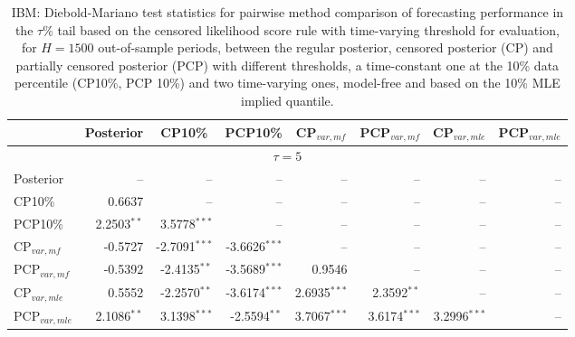 { \renewcommand{\arraystretch}{1.2} 
 {\footnotesize 
\begin{table} 
\center 
\begin{tabular}{l | rrrrrrr} 
& \multicolumn{1}{c}{Posterior}& \multicolumn{1}{c}{CP10\%}& \multicolumn{1}{c}{PCP10\%}& \multicolumn{1}{c}{CP$_{var,mf}$}& \multicolumn{1}{c}{PCP$_{var,mf}$}& \multicolumn{1}{c}{CP$_{var,mle}$}& \multicolumn{1}{c}{PCP$_{var,mle}$} \\ \hline 
\multicolumn{8}{c}{$\tau = 5$} \\ \hline 
Posterior &    --\phantom{$^{***}$} &    --\phantom{$^{***}$} &    --\phantom{$^{***}$} &    --\phantom{$^{***}$} &    --\phantom{$^{***}$} &    --\phantom{$^{***}$} &    --\phantom{$^{***}$}   \\ 
CP10\% & 0.6637\phantom{$^{***}$} &    --\phantom{$^{***}$} &    --\phantom{$^{***}$} &    --\phantom{$^{***}$} &    --\phantom{$^{***}$} &    --\phantom{$^{***}$} &    --\phantom{$^{***}$}   \\ 
PCP10\% & 2.2503$^{**}$\phantom{$^{*}$} & 3.5778$^{***}$ &    --\phantom{$^{***}$} &    --\phantom{$^{***}$} &    --\phantom{$^{***}$} &    --\phantom{$^{***}$} &    --\phantom{$^{***}$}   \\ 
CP$_{var,mf}$ & -0.5727\phantom{$^{***}$} & -2.7091$^{***}$ & -3.6626$^{***}$ &    --\phantom{$^{***}$} &    --\phantom{$^{***}$} &    --\phantom{$^{***}$} &    --\phantom{$^{***}$}   \\ 
PCP$_{var,mf}$ & -0.5392\phantom{$^{***}$} & -2.4135$^{**}$\phantom{$^{*}$} & -3.5689$^{***}$ & 0.9546\phantom{$^{***}$} &    --\phantom{$^{***}$} &    --\phantom{$^{***}$} &    --\phantom{$^{***}$}   \\ 
CP$_{var,mle}$ & 0.5552\phantom{$^{***}$} & -2.2570$^{**}$\phantom{$^{*}$} & -3.6174$^{***}$ & 2.6935$^{***}$ & 2.3592$^{**}$\phantom{$^{*}$} &    --\phantom{$^{***}$} &    --\phantom{$^{***}$}   \\ 
PCP$_{var,mle}$ & 2.1086$^{**}$\phantom{$^{*}$} & 3.1398$^{***}$ & -2.5594$^{**}$\phantom{$^{*}$} & 3.7067$^{***}$ & 3.6174$^{***}$ & 3.2996$^{***}$ &    --\phantom{$^{***}$}   \\ 
\hline 
\end{tabular}
 \caption{IBM: Diebold-Mariano test statistics for pairwise method comparison  of forecasting performance in the $\tau$\% tail based on  the censored likelihood score rule with  time-varying  threshold for evaluation,  for $H=1500$ out-of-sample periods,  between  the regular posterior, censored posterior (CP) and  partially censored posterior (PCP) with different thresholds,  a time-constant one at the 10\% data percentile (CP10\%, PCP 10\%) and two time-varying ones, model-free and based on the 10\% MLE implied quantile. }
\label{tab:IBM_DMv_5}  
\end{table}
}}